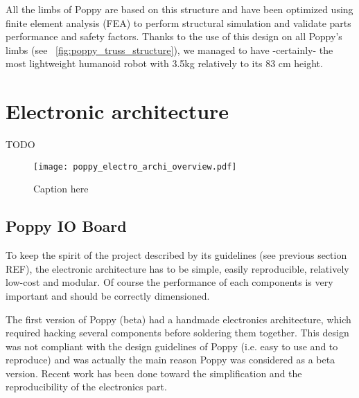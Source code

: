 All the limbs of Poppy are based on this structure and have been optimized using finite element analysis (FEA) to perform structural simulation and validate parts performance and safety factors.
Thanks to the use of this design on all Poppy's limbs (see \figurename~\ref{fig:poppy_truss_structure}), we managed to have -certainly- the most lightweight humanoid robot with 3.5kg relatively to its 83 cm height.






% 







\section{Electronic architecture} %

TODO

\begin{figure}[tb]
    \begin{center}
        \texttt{[image: poppy\_electro\_archi\_overview.pdf]}
    \end{center}
    \caption{Caption here}
    \label{fig:figure1}
\end{figure}



\subsection{Poppy IO Board} %

To keep the spirit of the project described by its guidelines (see previous section REF), the electronic architecture has to be simple, easily reproducible, relatively low-cost and modular. Of course the performance of each components is very important and should be correctly dimensioned.

The first version of Poppy (beta) had a handmade electronics architecture, which required hacking several components before soldering them together. This design was not compliant with the design guidelines of Poppy (i.e. easy to use and to reproduce) and was actually the main reason Poppy was considered as a beta version. Recent work has been done toward the simplification and the reproducibility of the electronics part.

